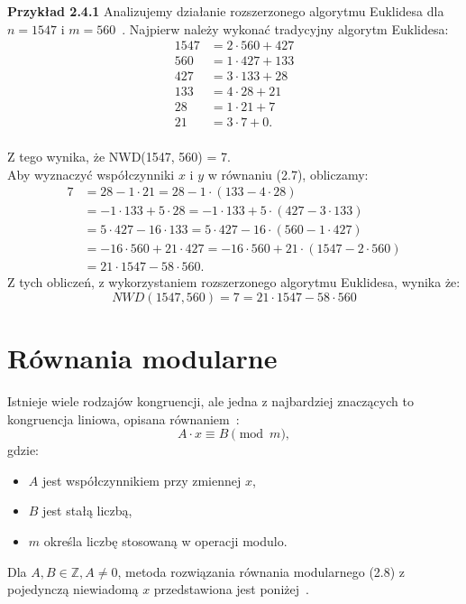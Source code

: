 \documentclass{SGGW-thesis}
\begin{document}
	\noindent \textbf{Przykład 2.4.1}
	Analizujemy działanie rozszerzonego algorytmu Euklidesa dla \( n = 1547 \) i \( m = 560 \)~\cite{ajakubiec}. Najpierw należy wykonać tradycyjny algorytm Euklidesa:
	\begin{align*}
		1547 &= 2 \cdot 560 + 427 \\
		560 &= 1 \cdot 427 + 133 \\
		427 &= 3 \cdot 133 + 28 \\
		133 &= 4 \cdot 28 + 21 \\
		28 &= 1 \cdot 21 + 7 \\
		21 &= 3 \cdot 7 + 0.
	\end{align*}\\
	\noindent Z tego wynika, że NWD(1547, 560) = 7.
	\vspace{1em}
	\\
	Aby wyznaczyć współczynniki \( x \) i \( y \) w równaniu (2.7), obliczamy:
	\begin{align*}
		7 &= 28 - 1 \cdot 21 = 28 - 1 \cdot (133 - 4 \cdot 28) \\
		&= -1 \cdot 133 + 5 \cdot 28 = -1 \cdot 133 + 5 \cdot (427 - 3 \cdot 133) \\
		&= 5 \cdot 427 - 16 \cdot 133 = 5 \cdot 427 - 16 \cdot (560 - 1 \cdot 427) \\
		&= -16 \cdot 560 + 21 \cdot 427 = -16 \cdot 560 + 21 \cdot (1547 - 2 \cdot 560) \\
		&= 21 \cdot 1547 - 58 \cdot 560.
	\end{align*}
	Z tych obliczeń, z wykorzystaniem rozszerzonego algorytmu Euklidesa, wynika że:
	\[ NWD(1547, 560) = 7 = 21 \cdot 1547 - 58 \cdot 560 \]
	\newpage
	
	\section{Równania modularne}
	Istnieje wiele rodzajów kongruencji, ale jedna z najbardziej znaczących to kongruencja liniowa, opisana równaniem~\cite{r25modulo}:
	\begin{equation}
		A \cdot x \equiv B \pmod{m},
	\end{equation}
	gdzie:
	\begin{itemize}
		\item \( A \) jest współczynnikiem przy zmiennej \( x \),
		\item \( B \) jest stałą liczbą,
		\item \( m \) określa liczbę stosowaną w operacji modulo.
	\end{itemize}
	Dla \( A, B \in \mathbb{Z}, A \neq 0 \), metoda rozwiązania równania modularnego (2.8) z pojedynczą niewiadomą \( x \) przedstawiona jest poniżej~\cite{azem}.
	
\end{document}
